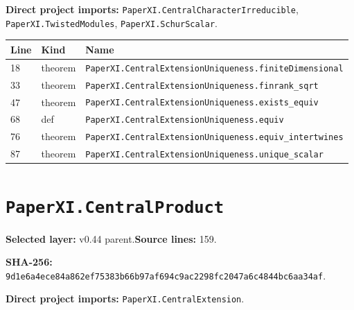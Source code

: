 \documentclass[10pt,oneside]{book}
\begin{document}

\textbf{Direct project imports:} \nolinkurl{PaperXI.CentralCharacterIrreducible}, \nolinkurl{PaperXI.TwistedModules}, \nolinkurl{PaperXI.SchurScalar}.

\begin{longtable}{@{}p{}p{}p{}@{}}\toprule Line&Kind&Name\\\midrule\endhead

18&theorem&\nolinkurl{PaperXI.CentralExtensionUniqueness.finiteDimensional}\\

33&theorem&\nolinkurl{PaperXI.CentralExtensionUniqueness.finrank_sqrt}\\

47&theorem&\nolinkurl{PaperXI.CentralExtensionUniqueness.exists_equiv}\\

68&def&\nolinkurl{PaperXI.CentralExtensionUniqueness.equiv}\\

76&theorem&\nolinkurl{PaperXI.CentralExtensionUniqueness.equiv_intertwines}\\

87&theorem&\nolinkurl{PaperXI.CentralExtensionUniqueness.unique_scalar}\\

\bottomrule\end{longtable}

\section{\texorpdfstring{\nolinkurl{PaperXI.CentralProduct}}{PaperXI.CentralProduct}}\label{module:PaperXI.CentralProduct}

\textbf{Selected layer:} v0.44 parent.\quad\textbf{Source lines:} 159.\par\textbf{SHA-256:} {\scriptsize\nolinkurl{9d1e6a4ece84a862ef75383b66b97af694c9ac2298fc2047a6c4844bc6aa34af}}.


\textbf{Direct project imports:} \nolinkurl{PaperXI.CentralExtension}.
\end{document}

